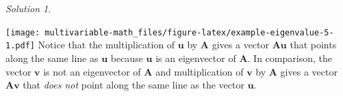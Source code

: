\documentclass[
]{book}
\newenvironment{Shaded}{\begin{snugshade}}{\end{snugshade}}
\newcommand{\DataTypeTok}[1]{\textcolor[rgb]{0.13,0.29,0.53}{#1}}
\newcommand{\DecValTok}[1]{\textcolor[rgb]{0.00,0.00,0.81}{#1}}
\newcommand{\KeywordTok}[1]{\textcolor[rgb]{0.13,0.29,0.53}{\textbf{#1}}}
\newcommand{\NormalTok}[1]{#1}
\newcommand{\OperatorTok}[1]{\textcolor[rgb]{0.81,0.36,0.00}{\textbf{#1}}}
\newcommand{\StringTok}[1]{\textcolor[rgb]{0.31,0.60,0.02}{#1}}
\theoremstyle{definition}
\theoremstyle{definition}
\theoremstyle{definition}
\theoremstyle{definition}
\theoremstyle{remark}
\newtheorem*{solution}{Solution}
\begin{document}
\begin{solution}
\begin{Shaded}
\end{Shaded}

\texttt{[image: multivariable-math\_files/figure-latex/example-eigenvalue-5-1.pdf]}
Notice that the multiplication of \(\mathbf{u}\) by \(\mathbf{A}\) gives a vector \(\mathbf{A} \mathbf{u}\) that points along the same line as \(\mathbf{u}\) because \(\mathbf{u}\) is an eigenvector of \(\mathbf{A}\). In comparison, the vector \(\mathbf{v}\) is not an eigenvector of \(\mathbf{A}\) and multiplication of \(\mathbf{v}\) by \(\mathbf{A}\) gives a vector \(\mathbf{A} \mathbf{v}\) that \emph{does not} point along the same line as the vector \(\mathbf{u}\).
\end{solution}
\end{document}
